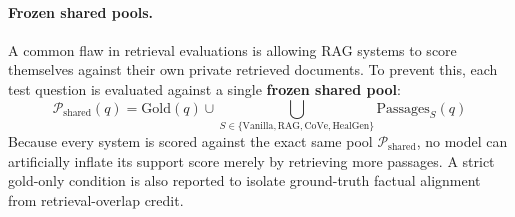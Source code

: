 \paragraph{Frozen shared pools.}
A common flaw in retrieval evaluations is allowing RAG systems to score themselves against their own private retrieved documents. To prevent this, each test question is evaluated against a single \textbf{frozen shared pool}:
\begin{equation}
  \mathcal{P}_{\text{shared}}(q) = \text{Gold}(q) \cup \bigcup_{S \in \{\text{Vanilla}, \text{RAG}, \text{CoVe}, \text{HealGen}\}} \text{Passages}_S(q)
\end{equation}
Because every system is scored against the exact same pool $\mathcal{P}_{\text{shared}}$, no model can artificially inflate its support score merely by retrieving more passages. A strict gold-only condition is also reported to isolate ground-truth factual alignment from retrieval-overlap credit.
